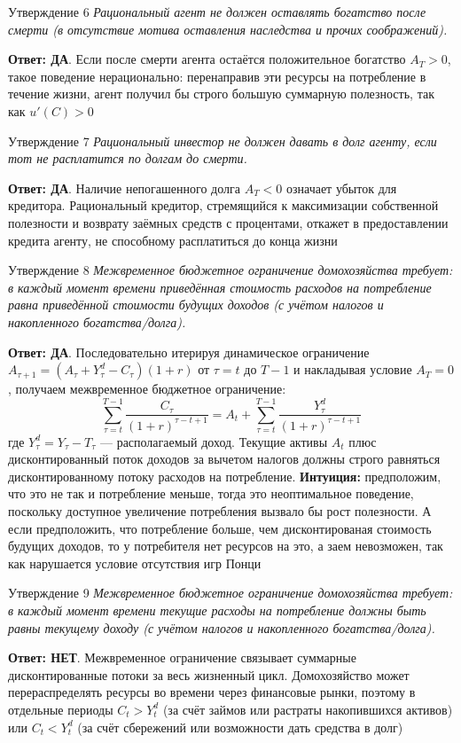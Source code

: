 \documentclass[10pt,a4paper]{article}
\newcommand{\qda}{\textbf{\color{yesgreen}Ответ: ДА}}
\newcommand{\qnet}{\textbf{\color{nored}Ответ: НЕТ}}
\newenvironment{answer}[2]{%
  \begin{qbox}{Утверждение #1}
  \textit{#2}\par\smallskip
}{%
  \end{qbox}\vspace{2pt}
}
\begin{document}
\begin{answer}{6}{Рациональный агент не должен оставлять богатство после смерти (в отсутствие мотива оставления наследства и прочих соображений).}
\qda. Если после смерти агента остаётся положительное богатство $A_T > 0$, такое поведение нерационально: перенаправив эти ресурсы на потребление в течение жизни, агент получил бы строго большую суммарную полезность, так как $u'(C) > 0$
\end{answer}

\begin{answer}{7}{Рациональный инвестор не должен давать в долг агенту, если тот не расплатится по долгам до смерти.}
\qda. Наличие непогашенного долга $A_T < 0$ означает убыток для кредитора. Рациональный кредитор, стремящийся к максимизации собственной полезности и возврату заёмных средств с процентами, откажет в предоставлении кредита агенту, не способному расплатиться до конца жизни
\end{answer}

\begin{answer}{8}{Межвременное бюджетное ограничение домохозяйства требует: в каждый момент времени приведённая стоимость расходов на потребление равна приведённой стоимости будущих доходов (с учётом налогов и накопленного богатства/долга).}
\qda. Последовательно итерируя динамическое ограничение $A_{\tau+1} = (A_\tau + Y_\tau^d - C_\tau)(1+r)$ от $\tau = t$ до $T-1$ и накладывая условие $A_T = 0$, получаем межвременное бюджетное ограничение:
\[
\sum_{\tau=t}^{T-1} \frac{C_\tau}{(1+r)^{\tau-t+1}} = A_t + \sum_{\tau=t}^{T-1} \frac{Y_\tau^d}{(1+r)^{\tau-t+1}}
\]
где $Y_\tau^d = Y_\tau - T_\tau$ — располагаемый доход. Текущие активы $A_t$ плюс дисконтированный поток доходов за вычетом налогов должны строго равняться дисконтированному потоку расходов на потребление. 
\textbf{Интуиция:} предположим, что это не так и потребление меньше, тогда это неоптимальное поведение, поскольку доступное увеличение потребления вызвало бы рост полезности. А если предположить, что потребление больше, чем дисконтированая стоимость будущих доходов, то у потребителя нет ресурсов на это, а заем невозможен, так как нарушается условие отсутствия игр Понци
\end{answer}

\begin{answer}{9}{Межвременное бюджетное ограничение домохозяйства требует: в каждый момент времени текущие расходы на потребление должны быть равны текущему доходу (с учётом налогов и накопленного богатства/долга).}
\qnet. Межвременное ограничение связывает суммарные дисконтированные потоки за весь жизненный цикл. Домохозяйство может перераспределять ресурсы во времени через финансовые рынки, поэтому в отдельные периоды $C_t > Y_t^d$ (за счёт займов или растраты накопившихся активов) или $C_t < Y_t^d$ (за счёт сбережений или возможности дать средства в долг) 
\end{answer}
\end{document}
